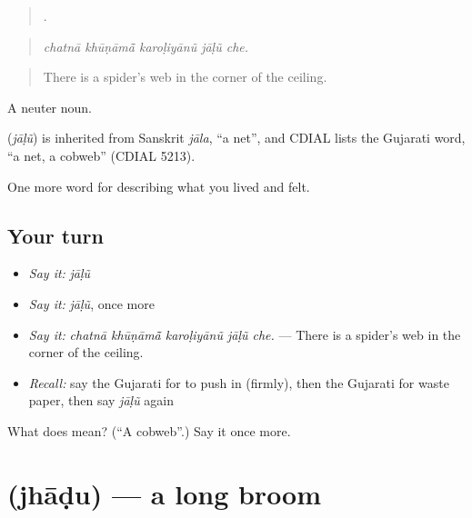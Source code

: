 \begin{quote}
    .
\end{quote}

\begin{quote}
\emph{chatnā khūṇāmā̃ karoḷiyānũ jāḷũ che.}
\end{quote}

\begin{quote}
There is a spider's web in the corner of the ceiling.
\end{quote}

A neuter noun.

\begin{cousinweb}
\textbf{} (\emph{jāḷũ}) is inherited from Sanskrit \emph{jāla}, \textquotedblleft{}a net\textquotedblright{}, and CDIAL lists the Gujarati word, \textquotedblleft{}a net, a cobweb\textquotedblright{} (CDIAL 5213).
\end{cousinweb}

\begin{grammarlens}[title={What you've built}]
One more word for describing what you lived and felt.
\end{grammarlens}

\subsection*{Your turn}
\begin{itemize}
\raggedright
  \item \emph{Say it:} \emph{jāḷũ}
  \item \emph{Say it:} \emph{jāḷũ}, once more
  \item \emph{Say it:} \emph{chatnā khūṇāmā̃ karoḷiyānũ jāḷũ che.} — There is a spider's web in the corner of the ceiling.
  \item \emph{Recall:} say the Gujarati for to push in (firmly), then the Gujarati for waste paper, then say \emph{jāḷũ} again
\end{itemize}

\begin{tcolorbox}[breakable,colback=teal!4,colframe=teal!35!black,title={Before you move on}]
What does  mean? (\textquotedblleft{}A cobweb\textquotedblright{}.) Say it once more.
\end{tcolorbox}
\section[\texorpdfstring{\gu{ઝાડુ} (jhāḍu)}{ઝાડુ (jhāḍu)}]{ (jhāḍu) — a long broom}


